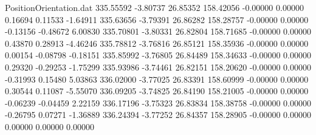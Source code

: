 \begin{filecontents}{PositionOrientation.dat}
 335.55592   -3.80737   26.85352   158.42056   -0.00000    0.00000    0.16694    0.11533   -1.64911
 335.63656   -3.79391   26.86282   158.28757   -0.00000    0.00000   -0.13156   -0.48672    6.00830
 335.70801   -3.80331   26.82804   158.71685   -0.00000    0.00000    0.43870    0.28913   -4.46246
 335.78812   -3.76816   26.85121   158.35936   -0.00000    0.00000    0.00154   -0.08798   -0.18151
 335.85992   -3.76805   26.84489   158.34633   -0.00000    0.00000    0.29320   -0.29253   -1.75299
 335.93986   -3.74461   26.82151   158.20620   -0.00000    0.00000   -0.31993    0.15480    5.03863
 336.02000   -3.77025   26.83391   158.60999   -0.00000    0.00000    0.30544    0.11087   -5.55070
 336.09205   -3.74825   26.84190   158.21005   -0.00000    0.00000   -0.06239   -0.04459    2.22159
 336.17196   -3.75323   26.83834   158.38758   -0.00000    0.00000   -0.26795    0.07271   -1.36889
 336.24394   -3.77252   26.84357   158.28905   -0.00000    0.00000    0.00000    0.00000    0.00000
\end{filecontents}